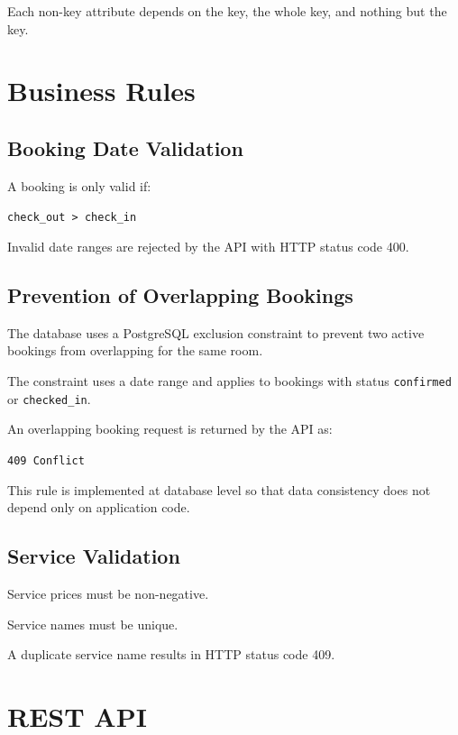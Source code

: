 \documentclass[12pt,a4paper]{article}
\begin{document}
Each non-key attribute depends on the key, the whole key, and nothing but
the key.

\section{Business Rules}

\subsection{Booking Date Validation}

A booking is only valid if:

\begin{center}
\texttt{check\_out > check\_in}
\end{center}

Invalid date ranges are rejected by the API with HTTP status code 400.

\subsection{Prevention of Overlapping Bookings}

The database uses a PostgreSQL exclusion constraint to prevent two active
bookings from overlapping for the same room.

The constraint uses a date range and applies to bookings with status
\texttt{confirmed} or \texttt{checked\_in}.

An overlapping booking request is returned by the API as:

\begin{center}
\texttt{409 Conflict}
\end{center}

This rule is implemented at database level so that data consistency does
not depend only on application code.

\subsection{Service Validation}

Service prices must be non-negative.

Service names must be unique.

A duplicate service name results in HTTP status code 409.

\section{REST API}
\end{document}
